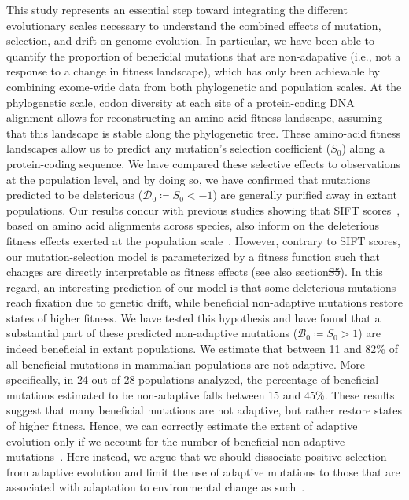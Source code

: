 \documentclass[10pt,letterpaper]{article}
\newcommand{\Sphy}{S_{0}}
\newcommand{\SphyDel}{\mathcal{D}_0}
\newcommand{\SphyBen}{\mathcal{B}_0}
\providecommand{\DIFaddtex}[1]{{\protect\color{blue}\uwave{#1}}} %
\providecommand{\DIFdeltex}[1]{{\protect\color{red}\sout{#1}}}                      %
\providecommand{\DIFaddbegin}{} %
\providecommand{\DIFaddend}{} %
\providecommand{\DIFdelbegin}{} %
\providecommand{\DIFdelend}{} %
\providecommand{\DIFadd}[1]{\texorpdfstring{\DIFaddtex{#1}}{#1}} %
\providecommand{\DIFdel}[1]{\texorpdfstring{\DIFdeltex{#1}}{}} %
\newcommand{\DIFscaledelfig}{0.5}
\newlength{\DIFdelgraphicswidth} %
\newlength{\DIFdelgraphicsheight} %
\newcommand{\DIFaddincludegraphics}[2][]{{\color{blue}\fbox{\DIFOincludegraphics[#1]{#2}}}} %
\newcommand{\DIFdelincludegraphics}[2][]{%
\sbox{\DIFdelgraphicsbox}{\DIFOincludegraphics[#1]{#2}}%
\settoboxwidth{\DIFdelgraphicswidth}{\DIFdelgraphicsbox} %
\settoboxtotalheight{\DIFdelgraphicsheight}{\DIFdelgraphicsbox} %
\scalebox{\DIFscaledelfig}{%
\parbox[b]{\DIFdelgraphicswidth}{\usebox{\DIFdelgraphicsbox}\\[-\baselineskip] \rule{\DIFdelgraphicswidth}{0em}}\llap{\resizebox{\DIFdelgraphicswidth}{\DIFdelgraphicsheight}{%
\setlength{\unitlength}{\DIFdelgraphicswidth}%
\begin{picture}(1,1)%
\thicklines\linethickness{2pt} %
{\color[rgb]{1,0,0}\put(0,0){\framebox(1,1){}}}%
{\color[rgb]{1,0,0}\put(0,0){\line( 1,1){1}}}%
{\color[rgb]{1,0,0}\put(0,1){\line(1,-1){1}}}%
\end{picture}%
}\hspace*{3pt}}} %
} %
\DeclareRobustCommand{\DIFaddbegin}{\DIFOaddbegin \let\includegraphics\DIFaddincludegraphics} %
\DeclareRobustCommand{\DIFaddend}{\DIFOaddend \let\includegraphics\DIFOincludegraphics} %
\DeclareRobustCommand{\DIFdelbegin}{\DIFOdelbegin \let\includegraphics\DIFdelincludegraphics} %
\DeclareRobustCommand{\DIFdelend}{\DIFOaddend \let\includegraphics\DIFOincludegraphics} %
\begin{document}
This study represents an essential step toward integrating the different evolutionary scales necessary to understand the combined effects of mutation, selection, and drift on genome evolution.
In particular, we have been able to quantify the proportion of beneficial mutations that are non-adapative (i.e., not a response to a change in fitness landscape), which has only been achievable by combining exome-wide data from both phylogenetic and population scales.
At the phylogenetic scale, codon diversity at each site of a protein-coding DNA alignment allows for reconstructing an amino-acid fitness landscape, assuming that this landscape is stable along the phylogenetic tree.
These amino-acid fitness landscapes allow us to predict any mutation’s selection coefficient ($\Sphy$) along a protein-coding sequence.
We have compared these selective effects to observations at the population level, and by doing so, we have confirmed that mutations predicted to be deleterious ($\SphyDel \coloneqq \Sphy < -1$) are generally purified away in extant populations.
Our results concur with previous studies showing that SIFT scores~\cite{ng_sift_2003, vaser_sift_2016}, based on amino acid alignments across species, also inform on the deleterious fitness effects exerted at the population scale~\cite{chen_hunting_2021}.
However, contrary to SIFT scores, our mutation-selection model is parameterized by a fitness function such that changes are directly interpretable as fitness effects (see also section\DIFdelbegin \DIFdel{S5}\DIFdelend \DIFaddbegin \DIFadd{~1 in~}\DIFaddend ).
In this regard, an interesting prediction of our model is that some deleterious mutations reach fixation due to genetic drift, while beneficial non-adaptive mutations restore states of higher fitness.
We have tested this hypothesis and have found that a substantial part of these predicted non-adaptive mutations ($\SphyBen \coloneqq \Sphy > 1 $) are indeed beneficial in extant populations.
We estimate that between 11 and 82\% of all beneficial mutations in mammalian populations are not adaptive.
More specifically, in 24 out of 28 populations analyzed, the percentage of beneficial mutations estimated to be non-adaptive falls between 15 and 45\%.
These results suggest that many beneficial mutations are not adaptive, but rather restore states of higher fitness.
Hence, we can correctly estimate the extent of adaptive evolution only if we account for the number of beneficial non-adaptive mutations~\cite{keightley_what_2010, rice_evolutionarily_2015}.
Here instead, we argue that we should dissociate positive selection from adaptive evolution and limit the use of adaptive mutations to those that are associated with adaptation to environmental change as such~\cite{charlesworth_other_2007, mustonen_fitness_2009, mustonen_fitness_2010}.
\end{document}
